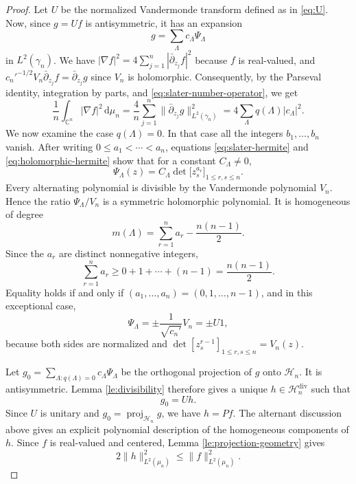 \documentclass[11pt,reqno]{amsart}
\numberwithin{equation}{section}%
\numberwithin{figure}{section}%
\numberwithin{table}{section}
\theoremstyle{plain}
\theoremstyle{definition}
\begin{document}
\begin{proof}
  Let $U$ be the normalized Vandermonde transform defined as in \eqref{eq:U}.
  Now, since $g=Uf$ is antisymmetric, it has an expansion
  \begin{equation}\label{eq:slater-expansion}
    g=\sum_\Lambda c_\Lambda\Psi_\Lambda
  \end{equation}
  in $L^2(\gamma_n)$. We have
  $|\nabla f|^2=4\sum_{j=1}^n|\bar\partial_{z_j}f|^2$ because $f$ is
  real-valued, and $c_n'^{-1/2}V_n\bar\partial_{z_j}f=\bar\partial_{z_j}g$
  since $V_n$ is holomorphic. Consequently, by the Parseval identity,
  integration by parts, and \eqref{eq:slater-number-operator}, we get
  \begin{equation}
    \frac{1}{n}\int_{\mathbb{C}^n}|\nabla f|^2\,\mathrm{d}\mu_n
    =\frac{4}{n}\sum_{j=1}^n\|\bar\partial_{z_j}g\|_{L^2(\gamma_n)}^2
    =4\sum_\Lambda q(\Lambda)|c_\Lambda|^2.
    \label{eq:slater-energy}
  \end{equation}
  We now examine the case $q(\Lambda)=0$. In that case all the integers
  $b_1,\ldots,b_n$ vanish. After writing $0\leq a_1<\cdots<a_n$, equations
  \eqref{eq:slater-hermite} and \eqref{eq:holomorphic-hermite} show that
  for a constant $C_\Lambda\neq0$,
  \begin{equation}\label{eq:holomorphic-slater-alternant}
    \Psi_\Lambda(z) = C_\Lambda \det\bigl[z_s^{a_r}\bigr]_{1\leq r,s\leq n}.
  \end{equation}
  Every alternating polynomial is divisible by the Vandermonde polynomial
  $V_n$. Hence the ratio $\Psi_\Lambda/V_n$ is a symmetric holomorphic
  polynomial. It is homogeneous of degree
  \begin{equation}\label{eq:alternant-degree}
    m(\Lambda)
    =
    \sum_{r=1}^n a_r-\frac{n(n-1)}{2}.
  \end{equation}
  Since the $a_r$ are distinct nonnegative integers,
  \[
    \sum_{r=1}^na_r \geq 0+1+\cdots+(n-1) = \frac{n(n-1)}{2}.
  \]
  Equality holds if and only if $(a_1,\ldots,a_n)=(0,1,\ldots,n-1)$, and in
  this exceptional case,
  \[
    \Psi_\Lambda = \pm \frac{1}{\sqrt{c_n'}}V_n = \pm U1,
  \]
  because both sides are normalized and $\det[z_s^{r-1}]_{1\leq r,s\leq n}=V_n(z)$.
  
  Let $g_0 = \sum_{\Lambda:q(\Lambda)=0} c_\Lambda\Psi_\Lambda$ be the
  orthogonal projection of $g$ onto $\mathcal{H}_n$. It is antisymmetric.
  Lemma \ref{le:divisibility} therefore gives a unique
  $h\in\mathcal{H}_n^{\mathrm{div}}$ such that
  \[
    g_0=Uh.
  \]
  Since $U$ is unitary and $g_0=\operatorname{proj}_{\mathcal{H}_n}g$, we have
  $h=Pf$. The alternant discussion above gives an explicit polynomial
  description of the homogeneous components of $h$. Since $f$ is real-valued
  and centered, Lemma \ref{le:projection-geometry} gives
  \begin{equation}\label{eq:holomorphic-projection-half-bound}
    2\|h\|_{L^2(\mu_n)}^2
    \leq
    \|f\|_{L^2(\mu_n)}^2.
  \end{equation}


\end{proof}
\end{document}
